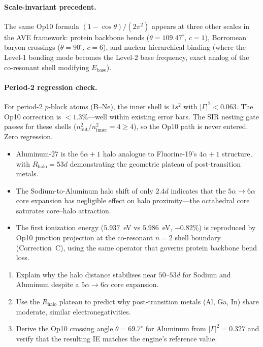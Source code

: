 \paragraph{Scale-invariant precedent.}
The same Op10 formula $(1-\cos\theta)/(2\pi^2)$ appears at three other scales in the AVE framework: protein backbone bends ($\theta = 109.47^\circ$, $c = 1$), Borromean baryon crossings ($\theta = 90^\circ$, $c = 6$), and nuclear hierarchical binding (where the Level-1 bonding mode becomes the Level-2 base frequency, exact analog of the co-resonant shell modifying $E_\text{base}$).

\paragraph{Period-2 regression check.}
For period-2 $p$-block atoms (B--Ne), the inner shell is $1s^2$ with $|\Gamma|^2 < 0.063$.  The Op10 correction is $<1.3\%$---well within existing error bars.  The SIR nesting gate passes for these shells ($n_\text{out}^2/n_\text{inner}^2 = 4 \geq 4$), so the Op10 path is never entered.  Zero regression.

\begin{summarybox}
\begin{itemize}
    \item Aluminum-27 is the $6\alpha + 1$ halo analogue to Fluorine-19's $4\alpha + 1$ structure, with $R_{\text{halo}} = 53d$ demonstrating the geometric plateau of post-transition metals.
    \item The Sodium-to-Aluminum halo shift of only $2.4d$ indicates that the $5\alpha \to 6\alpha$ core expansion has negligible effect on halo proximity---the octahedral core saturates core--halo attraction.
    \item The first ionization energy ($5.937$~eV vs $5.986$~eV, $-0.82\%$) is reproduced by Op10 junction projection at the co-resonant $n = 2$ shell boundary (Correction~C), using the same operator that governs protein backbone bend loss.
\end{itemize}
\end{summarybox}

\begin{exercisebox}
\begin{enumerate}
    \item Explain why the halo distance stabilises near $50$--$53d$ for Sodium and Aluminum despite a $5\alpha \to 6\alpha$ core expansion.
    \item Use the $R_{\text{halo}}$ plateau to predict why post-transition metals (Al, Ga, In) share moderate, similar electronegativities.
    \item Derive the Op10 crossing angle $\theta = 69.7^\circ$ for Aluminum from $|\Gamma|^2 = 0.327$ and verify that the resulting IE matches the engine's reference value.
\end{enumerate}
\end{exercisebox}

